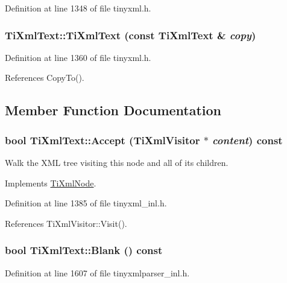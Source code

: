 Definition at line 1348 of file tinyxml.h.\hypertarget{class_ti_xml_text_a8d2cc1b4af2208cbb0171cf20f6815d1}{
\subsubsection[{TiXmlText}]{\setlength{\rightskip}{0pt plus 5cm}TiXmlText::TiXmlText (const {\bf TiXmlText} \& {\em copy})}}
\label{class_ti_xml_text_a8d2cc1b4af2208cbb0171cf20f6815d1}


Definition at line 1360 of file tinyxml.h.

References CopyTo().

\subsection{Member Function Documentation}
\hypertarget{class_ti_xml_text_a43b9954ebf679557fac1a4453f337b7c}{
\subsubsection[{Accept}]{\setlength{\rightskip}{0pt plus 5cm}bool TiXmlText::Accept ({\bf TiXmlVisitor} $\ast$ {\em content}) const}}
\label{class_ti_xml_text_a43b9954ebf679557fac1a4453f337b7c}
Walk the XML tree visiting this node and all of its children. 

Implements \hyperlink{class_ti_xml_node_acc0f88b7462c6cb73809d410a4f5bb86}{TiXmlNode}.

Definition at line 1385 of file tinyxml\_\-inl.h.

References TiXmlVisitor::Visit().\hypertarget{class_ti_xml_text_a1c120428e3b3cf24d79706e6d2b65aa6}{
\subsubsection[{Blank}]{\setlength{\rightskip}{0pt plus 5cm}bool TiXmlText::Blank () const}}
\label{class_ti_xml_text_a1c120428e3b3cf24d79706e6d2b65aa6}


Definition at line 1607 of file tinyxmlparser\_\-inl.h.

